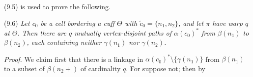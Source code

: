 \stmt
(9.5) is used to prove the following.

\stmt
(9.6) \textit{Let $c_0$ be a cell bordering a cuff $\Theta$ with $\tilde{c}_0 = \{n_1, n_2\}$, and let $\pi$ have warp $q$ at $\Theta$. Then there are $q$ mutually vertex-disjoint paths of $\alpha(c_0)^*$ from $\beta(n_1)$ to $\beta(n_2)$, each containing neither $\gamma(n_1)$ nor $\gamma(n_2)$.}

\textit{Proof.} We claim first that there is a linkage in $\alpha(c_0)^* \setminus \{\gamma(n_1)\}$ from $\beta(n_1)$ to a subset of $\beta(n_2+)$ of cardinality $q$. For suppose not; then by
